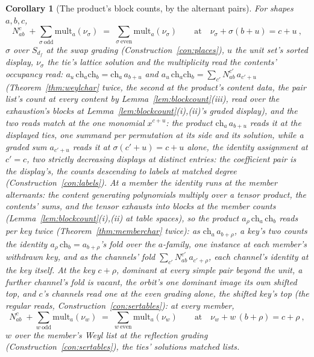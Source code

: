 \documentclass[11pt]{article}
\newtheorem{corollary}{Corollary}
\theoremstyle{definition}
\begin{document}
\begin{corollary}[The product's block counts, by the alternant pairs]
\label{cor:steinberg}
For shapes $a,b,c$,
\[
N^c_{ab}\;+\sum_{\sigma\ \mathrm{odd}}
\mathrm{mult}_a(\nu_\sigma)
\;=\;\sum_{\sigma\ \mathrm{even}}\mathrm{mult}_a(\nu_\sigma)
\qquad\text{at}\quad
\nu_\sigma+\sigma(b+u)=c+u\ ,
\]
$\sigma$ over $S_{d_f}$ at the swap grading
(Construction~\ref{con:places}), $u$ the unit set's sorted display,
$\nu_\sigma$ the tie's lattice
solution and the multiplicity read the contents' occupancy read:
$a_u\,\mathrm{ch}_a\mathrm{ch}_b=\mathrm{ch}_a\,a_{b+u}$ and
$a_u\,\mathrm{ch}_a\mathrm{ch}_b=\sum_{c'}N^{c'}_{ab}\,a_{c'+u}$
(Theorem~\ref{thm:weylchar} twice, the second at the product's
content data, the pair list's count at every content by
Lemma~\ref{lem:blockcount}(iii), read over the exhaustion's
blocks at Lemma~\ref{lem:blockcount}(i),(ii)'s graded display),
and the two reads match at the
one monomial $x^{c+u}$: the product $\mathrm{ch}_a\,a_{b+u}$ reads
it at the displayed ties, one summand per permutation at its side
and its solution, while a graded sum $a_{c'+u}$ reads it at
$\sigma(c'+u)=c+u$ alone, the identity assignment at $c'=c$, two
strictly decreasing displays at distinct entries: the coefficient
pair is the display's, the counts
descending to labels at matched degree (Construction~\ref{con:labels}).
At a member the identity runs at the member alternants: the
content generating polynomials multiply over a tensor product, the
contents' sums, and the tensor exhausts into blocks at the member
counts (Lemma~\ref{lem:blockcount}(i),(ii) at table spaces), so
the product $a_\rho\,\mathrm{ch}_a\,\mathrm{ch}_b$ reads per key
twice (Theorem~\ref{thm:memberchar} twice): as
$\mathrm{ch}_a\,a_{b+\rho}$, a key's two counts the identity
$a_\rho\,\mathrm{ch}_b=a_{b+\rho}$'s fold over the $a$-family, one
instance at each member's withdrawn key, and as the channels' fold
$\sum_{c'}N^{c'}_{ab}\,a_{c'+\rho}$, each channel's identity at the
key itself. At the key $c+\rho$, dominant at every simple pair
beyond the unit, a further channel's fold is vacant, the orbit's
one dominant image its own shifted top, and $c$'s channels read one
at the even grading alone, the shifted key's top (the regular
reads, Construction~\ref{con:sertables}): at every
member,
\[
N^c_{ab}\;+\sum_{w\ \mathrm{odd}}\mathrm{mult}_a(\nu_w)
\;=\;\sum_{w\ \mathrm{even}}\mathrm{mult}_a(\nu_w)
\qquad\text{at}\quad
\nu_w+w\,(b+\rho)=c+\rho\ ,
\]
$w$ over the member's Weyl list at the reflection grading
(Construction~\ref{con:sertables}), the ties' solutions matched
lists.
\end{corollary}
\end{document}

